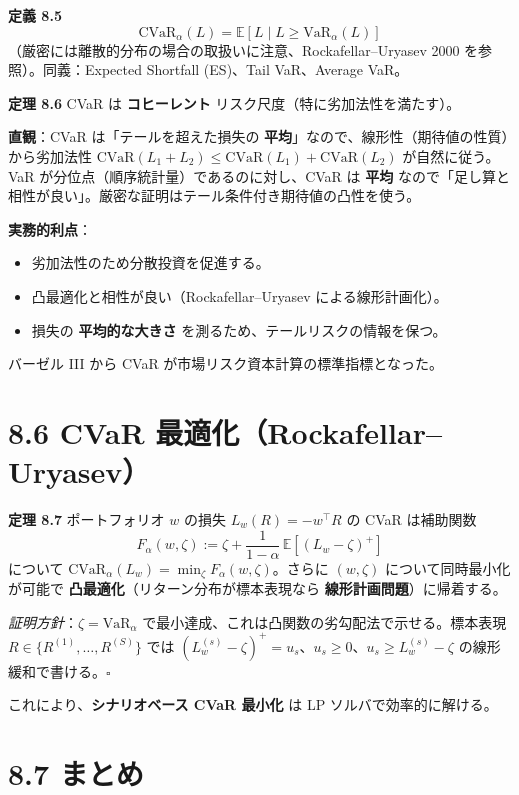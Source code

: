 \documentclass[11pt,a4paper]{report}
\begin{document}
\textbf{定義 8.5} \[ \mathrm{CVaR}_\alpha(L) = \mathbb{E}[L \mid L \ge \mathrm{VaR}_\alpha(L)] \] （厳密には離散的分布の場合の取扱いに注意、Rockafellar–Uryasev 2000 を参照）。同義：Expected Shortfall (ES)、Tail VaR、Average VaR。

\textbf{定理 8.6} CVaR は \textbf{コヒーレント} リスク尺度（特に劣加法性を満たす）。

\textbf{直観}：CVaR は「テールを超えた損失の \textbf{平均}」なので、線形性（期待値の性質）から劣加法性 $\mathrm{CVaR}(L_1 + L_2) \le \mathrm{CVaR}(L_1) + \mathrm{CVaR}(L_2)$ が自然に従う。VaR が分位点（順序統計量）であるのに対し、CVaR は \textbf{平均} なので「足し算と相性が良い」。厳密な証明はテール条件付き期待値の凸性を使う。

\textbf{実務的利点}：
\begin{itemize}
\item 劣加法性のため分散投資を促進する。
\item 凸最適化と相性が良い（Rockafellar–Uryasev による線形計画化）。
\item 損失の \textbf{平均的な大きさ} を測るため、テールリスクの情報を保つ。
\end{itemize}

バーゼル III から CVaR が市場リスク資本計算の標準指標となった。

\section{8.6 CVaR 最適化（Rockafellar–Uryasev）}

\textbf{定理 8.7} ポートフォリオ $w$ の損失 $L_w(R) = -w^\top R$ の CVaR は補助関数 \[ F_\alpha(w, \zeta) := \zeta + \frac{1}{1-\alpha}\, \mathbb{E}[(L_w - \zeta)^+] \] について $\mathrm{CVaR}_\alpha(L_w) = \min_\zeta F_\alpha(w, \zeta)$。さらに $(w, \zeta)$ について同時最小化が可能で \textbf{凸最適化}（リターン分布が標本表現なら \textbf{線形計画問題}）に帰着する。

\emph{証明方針}：$\zeta = \mathrm{VaR}_\alpha$ で最小達成、これは凸関数の劣勾配法で示せる。標本表現 $R \in \{R^{(1)}, \dots, R^{(S)}\}$ では $(L_w^{(s)} - \zeta)^+ = u_s$、$u_s \ge 0$、$u_s \ge L_w^{(s)} - \zeta$ の線形緩和で書ける。$\square$

これにより、\textbf{シナリオベース CVaR 最小化} は LP ソルバで効率的に解ける。

\section{8.7 まとめ}
\end{document}
